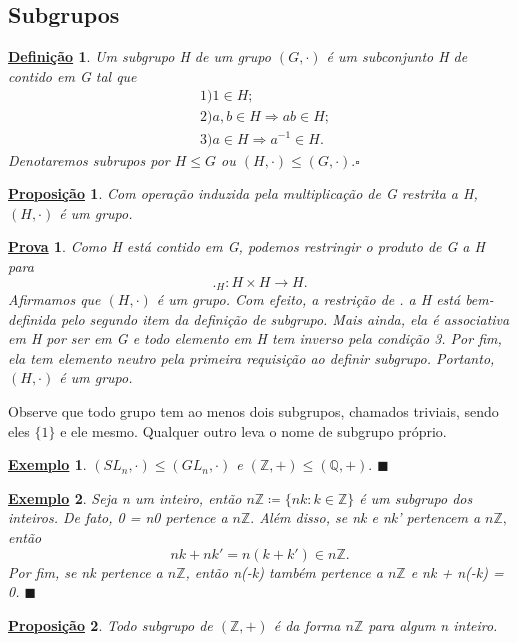\documentclass{article}
\newtheorem*{def*}{\underline{Defini\c c\~ao}}
\newtheorem*{prop*}{\underline{Proposi\c c\~ao}}
\newtheorem{example*}{\underline{Exemplo}}
\newtheorem*{proof*}{\underline{Prova}}
\renewcommand\qedsymbol{$\blacksquare$}
\begin{document}
\subsection{Subgrupos}
 \begin{def*}
   Um subgrupo H de um grupo $(G, \cdot)$ \'e um subconjunto H de contido em G tal que
  \begin{align*}
    &1) 1\in H; \\
    &2) a, b\in H\Rightarrow ab \in H; \\
    &3) a\in H\Rightarrow a^{-1}\in H.
  \end{align*}
  Denotaremos subrupos por $H \leq{G}$ ou $(H, \cdot) \leq{(G, \cdot)}. \square$
 \end{def*}
\begin{prop*}
 Com opera\c c\~ao induzida pela multiplica\c c\~ao de G restrita a H, $(H, \cdot)$ \'e um grupo. 
\end{prop*}
\begin{proof*}
  Como H est\'a contido em G, podemos restringir o produto de G a H para 
  $$
    ._H:H \times H\rightarrow H.
  $$
  Afirmamos que $(H, \cdot)$ \'e um grupo. Com efeito, a restri\c c\~ao de . a H est\'a bem-definida pelo segundo item da defini\c c\~ao
de subgrupo. Mais ainda, ela \'e associativa em H por ser em G e todo elemento em H tem inverso pela condi\c c\~ao 3. Por fim,
ela tem elemento neutro pela primeira requisi\c c\~ao ao definir subgrupo. Portanto, $(H, \cdot)$ \'e um grupo.
\end{proof*}
Observe que todo grupo tem ao menos dois subgrupos, chamados triviais, sendo eles $\{1\}$ e ele mesmo. Qualquer outro leva o nome de
subgrupo pr\'oprio.
\begin{example*}
  $(SL_{n}, \cdot) \leq{(GL_{n}, \cdot)}$ e $(\mathbb{Z}, +) \leq{(\mathbb{Q}, +)}.$ \qedsymbol
\end{example*}
\begin{example*}
  Seja n um inteiro, ent\~ao $n\mathbb{Z}\coloneqq \{nk: k\in \mathbb{Z}\}$ \'e um subgrupo dos inteiros. De fato, 0 = n0 pertence
  a $n\mathbb{Z}.$ Al\'em disso, se nk e nk' pertencem a $n\mathbb{Z},$ ent\~ao
  $$
    nk + nk' = n(k + k')\in n \mathbb{Z}.
  $$
  Por fim, se nk pertence a $ n\mathbb{Z}$, ent\~ao n(-k) tamb\'em pertence a $n \mathbb{Z}$ e nk + n(-k) = 0. \qedsymbol
\end{example*}
\begin{prop*}
  Todo subgrupo de $(\mathbb{Z}, +)$ \'e da forma $n \mathbb{Z}$ para algum n inteiro.
\end{prop*}
\end{document}
